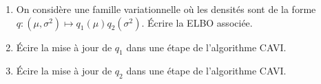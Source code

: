 \documentclass[a4paper,10pt,fleqn]{article}
\newcommand{\1}{\ensuremath{\mathbbm{1}}}
\begin{document}
\begin{enumerate}
\item On consid\`ere une famille variationnelle o\`u les densit\'es sont de la forme $q:(\mu,\sigma^2)\mapsto q_1(\mu)q_{2}(\sigma^2)$. \'Ecrire la ELBO associ\'ee.
%
%
\item \'Ecire la mise \`a jour de $q_1$ dans une \'etape de l'algorithme CAVI. 
%
%
\item \'Ecire la mise \`a jour de $q_{2}$ dans une \'etape de l'algorithme CAVI. 
%
%
\end{enumerate}
\end{document}
